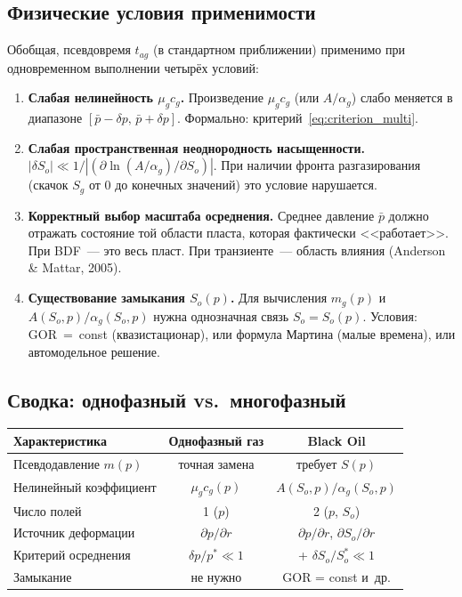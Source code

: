 \documentclass[12pt,a4paper]{article}
\begin{document}
\subsection{Физические условия применимости}
\label{ssec:phys_conditions}

Обобщая, псевдовремя $t_{ag}$ (в стандартном приближении)
применимо при одновременном выполнении четырёх условий:

\begin{enumerate}
  \item \textbf{Слабая нелинейность $\mu_g c_g$.}
        Произведение $\mu_g c_g$ (или $A/\alpha_g$)
        слабо меняется в диапазоне $[\bar{p}-\delta p,\,
        \bar{p}+\delta p]$. Формально:
        критерий~\eqref{eq:criterion_multi}.

  \item \textbf{Слабая пространственная неоднородность
        насыщенности.}
        $|\delta S_o| \ll 1/|(\partial\ln(A/\alpha_g)/
        \partial S_o)|$. При наличии фронта разгазирования
        (скачок $S_g$ от 0 до конечных значений) это
        условие нарушается.

  \item \textbf{Корректный выбор масштаба осреднения.}
        Среднее давление $\bar{p}$ должно отражать
        состояние той области пласта, которая фактически
        <<работает>>. При BDF~--- это весь пласт.
        При транзиенте~--- область влияния
        (Anderson \& Mattar, 2005).

  \item \textbf{Существование замыкания $S_o(p)$.}
        Для вычисления $m_g(p)$ и $A(S_o,p)/\alpha_g(S_o,p)$
        нужна однозначная связь $S_o = S_o(p)$.
        Условия: GOR~=~const (квазистационар),
        или формула Мартина (малые времена),
        или автомодельное решение.
\end{enumerate}

\subsection{Сводка: однофазный vs.\ многофазный}

\begin{center}
\begin{tabular}{p{}cc}
\hline
\textbf{Характеристика} & \textbf{Однофазный газ} & \textbf{Black Oil} \\
\hline
Псевдодавление $m(p)$ & точная замена & требует $S(p)$ \\
Нелинейный коэффициент & $\mu_g c_g(p)$ & $A(S_o,p)/\alpha_g(S_o,p)$ \\
Число полей & 1 ($p$) & 2 ($p$, $S_o$) \\
Источник деформации & $\partial p/\partial r$ & $\partial p/\partial r$, $\partial S_o/\partial r$ \\
Критерий осреднения & $\delta p / p^* \ll 1$ & + $\delta S_o / S_o^* \ll 1$ \\
Замыкание & не нужно & GOR = const и~др. \\
\hline
\end{tabular}
\end{center}
\end{document}
